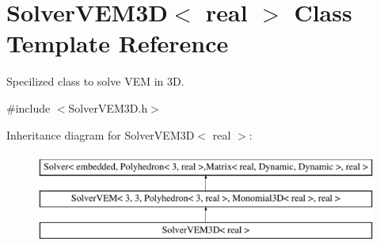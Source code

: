 \hypertarget{class_solver_v_e_m3_d}{\section{\-Solver\-V\-E\-M3\-D$<$ real $>$ \-Class \-Template \-Reference}
\label{class_solver_v_e_m3_d}
}


\-Specilized class to solve \-V\-E\-M in 3\-D.  




{\ttfamily \#include $<$\-Solver\-V\-E\-M3\-D.\-h$>$}

\-Inheritance diagram for \-Solver\-V\-E\-M3\-D$<$ real $>$\-:\begin{figure}[H]
\begin{center}
\leavevmode
\includegraphics[height=3.000000cm]{class_solver_v_e_m3_d}
\end{center}
\end{figure}
